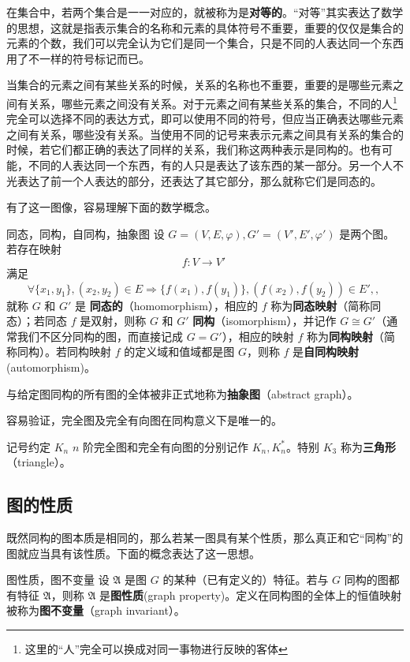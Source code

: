 在集合中，若两个集合是一一对应的，就被称为是\textbf{对等的}。“对等”其实表达了数学的思想，这就是指表示集合的名称和元素的具体符号不重要，重要的仅仅是集合的元素的个数，我们可以完全认为它们是同一个集合，只是不同的人表达同一个东西用了不一样的符号标记而已。

当集合的元素之间有某些关系的时候，关系的名称也不重要，重要的是哪些元素之间有关系，哪些元素之间没有关系。对于元素之间有某些关系的集合，不同的人\footnote{这里的“人”完全可以换成对同一事物进行反映的客体}完全可以选择不同的表达方式，即可以使用不同的符号，但应当正确表达哪些元素之间有关系，哪些没有关系。当使用不同的记号来表示元素之间具有关系的集合的时候，若它们都正确的表达了同样的关系，我们称这两种表示是同构的。也有可能，不同的人表达同一个东西，有的人只是表达了该东西的某一部分。另一个人不光表达了前一个人表达的部分，还表达了其它部分，那么就称它们是同态的。

有了这一图像，容易理解下面的数学概念。
\begin{definition}{同态，同构，自同构，抽象图}
设 $G=(V,E,\varphi),G'=(V',E',\varphi')$ 是两个图。若存在映射
\begin{equation}
f:V\rightarrow V'~
\end{equation}
满足
\begin{equation}
\forall\{x_1,y_1\},(x_2,y_2)\in E\Rightarrow \{f(x_1),f(y_1)\},(f(x_2),f(y_2))\in E',,~
\end{equation}
就称 $G$ 和 $G'$ 是 \textbf{同态的}（homomorphism），相应的 $f$ 称为\textbf{同态映射}（简称同态）；若同态 $f$ 是双射，则称 $G$ 和 $G'$ \textbf{同构}（isomorphism），并记作 $G\cong G'$（通常我们不区分同构的图，而直接记成 $G=G'$），相应的映射 $f$ 称为\textbf{同构映射}（简称同构）。若同构映射 $f$ 的定义域和值域都是图 $G$，则称 $f$ 是\textbf{自同构映射}(automorphism)。

与给定图同构的所有图的全体被非正式地称为\textbf{抽象图}（abstract graph）。
\end{definition}

容易验证，完全图及完全有向图在同构意义下是唯一的。
\begin{definition}{记号约定 $K_n$}
$n$ 阶完全图和完全有向图的分别记作 $K_n,K_n^*$。特别 $K_3$ 称为\textbf{三角形}（triangle）。
\end{definition}



\subsection{图的性质}
既然同构的图本质是相同的，那么若某一图具有某个性质，那么真正和它“同构”的图就应当具有该性质。下面的概念表达了这一思想。
\begin{definition}{图性质，图不变量}
设 $\mathfrak A$ 是图 $G$ 的某种（已有定义的）特征。若与 $G$ 同构的图都有特征 $\mathfrak A$，则称 $\mathfrak A$ 是\textbf{图性质}(graph property)。定义在同构图的全体上的恒值映射被称为\textbf{图不变量}（graph invariant）。
\end{definition}

